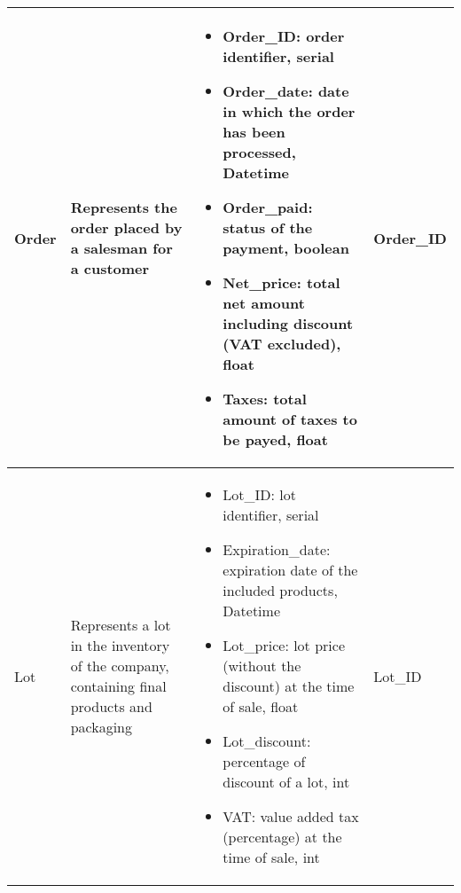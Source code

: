 \begin{longtable}{|p{}|p{} |p{}|p{} |}
    Order & Represents the order placed by a salesman for a customer &
    \begin{itemize}
        \vspace{-1em}
        \item Order\_ID:   order identifier, serial
        \item Order\_date:   date in which the order has been processed, Datetime
        \item Order\_paid:   status of the payment, boolean
        \item Net\_price:   total net amount including discount (VAT excluded), float    %
        \item Taxes:   total amount of taxes to be payed, float                     %
    \end{itemize}
    &  Order\_ID \\\hline


    Lot & Represents a lot in the inventory of the company, containing final products and packaging &
    \begin{itemize}
        \vspace{-1em}
        \item Lot\_ID:   lot identifier, serial
        \item Expiration\_date:   expiration date of the included products, Datetime
        \item Lot\_price:   lot price (without the discount) at the time of sale, float
        \item Lot\_discount:   percentage of discount of a lot, int
        \item VAT:   value added tax (percentage) at the time of sale, int
    \end{itemize}
    &  Lot\_ID \\\hline


\end{longtable}
